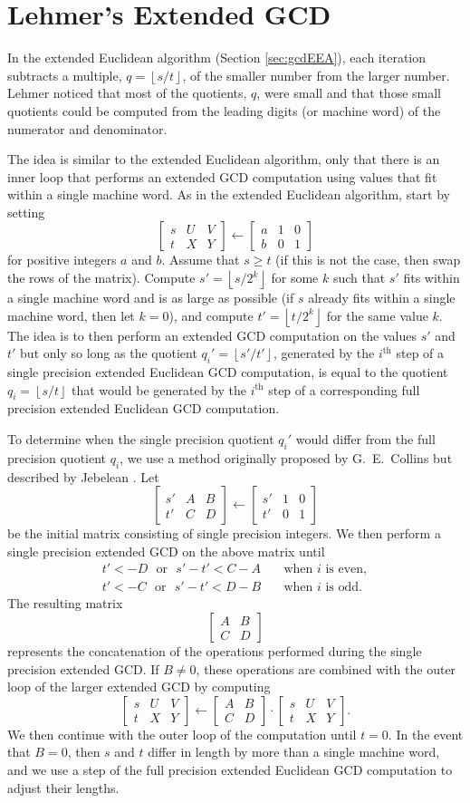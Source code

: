 \documentclass{ucalgthes1}
\theoremstyle{definition}
\newcommand{\matrixtt}[4]{\left[ \begin{array}{rr} #1 & #2 \\ #3 & #4 \end{array} \right]}
\newcommand{\matrixThreeTwo}[6]{\left[ \begin{array}{rrr} #1 & #2 & #3 \\ #4 & #5 & #6 \end{array} \right]}
\newcommand{\floor}[1]{\left\lfloor #1 \right\rfloor}
\newcommand{\ith}{i^{\textrm{th}}}
\begin{document}
\section{Lehmer's Extended GCD}
\label{sec:gcdLehmer}

In the extended Euclidean algorithm (Section \ref{sec:gcdEEA}), each iteration subtracts a multiple, \mbox{$q = \floor{s / t}$}, of the smaller number from the larger number.  Lehmer \cite{Lehmer1938} noticed that most of the quotients, $q$, were small and that those small quotients could be computed from the leading digits (or machine word) of the numerator and denominator.

The idea is similar to the extended Euclidean algorithm, only that there is an inner loop that performs an extended GCD computation using values that fit within a single machine word.  As in the extended Euclidean algorithm, start by setting
\[
	\matrixThreeTwo{s}{U}{V}{t}{X}{Y} \gets \matrixThreeTwo{a}{1}{0}{b}{0}{1}
\]
for positive integers $a$ and $b$.  Assume that $s \ge t$ (if this is not the case, then swap the rows of the matrix).  Compute $s'=\floor{s/2^k}$ for some $k$ such that $s'$ fits within a single machine word and is as large as possible (if $s$ already fits within a single machine word, then let $k=0$), and compute $t' = \floor{t/2^k}$ for the same value $k$.  The idea is to then perform an extended GCD computation on the values $s'$ and $t'$ but only so long as the quotient ${q_i}' = \floor{s'/t'}$, generated by the $\ith$ step of a single precision extended Euclidean GCD computation, is equal to the quotient $q_i=\floor{s/t}$ that would be generated by the $\ith$ step of a corresponding full precision extended Euclidean GCD computation.

To determine when the single precision quotient ${q_i}'$ would differ from the full precision quotient $q_i$, we use a method originally proposed by G.\ E.\ Collins but described by Jebelean \cite[Theorem 1]{Jebelean1993}.  Let
\[
\matrixThreeTwo{s'}{A}{B}{t'}{C}{D} \gets \matrixThreeTwo{s'}{1}{0}{t'}{0}{1}
\]
be the initial matrix consisting of single precision integers.  We then perform a single precision extended GCD on the above matrix until
\begin{align*}
  t' < -D \textrm{~~or~~} s' - t' < C - A &\textrm{~~~when $i$ is even}, \\
  t' < -C \textrm{~~or~~} s' - t' < D - B &\textrm{~~~when $i$ is odd}.
\end{align*}
The resulting matrix
\[
	\matrixtt{A}{B}{C}{D}
\]
represents the concatenation of the operations performed during the single precision extended GCD.  If $B \neq 0$, these operations are combined with the outer loop of the larger extended GCD by computing
\[
\matrixThreeTwo{s}{U}{V}{t}{X}{Y} \gets \matrixtt{A}{B}{C}{D}
		        \cdot \matrixThreeTwo{s}{U}{V}{t}{X}{Y}.
\]
We then continue with the outer loop of the computation until $t = 0$.  In the event that $B=0$, then $s$ and $t$ differ in length by more than a single machine word, and we use a step of the full precision extended Euclidean GCD computation to adjust their lengths.
\end{document}
